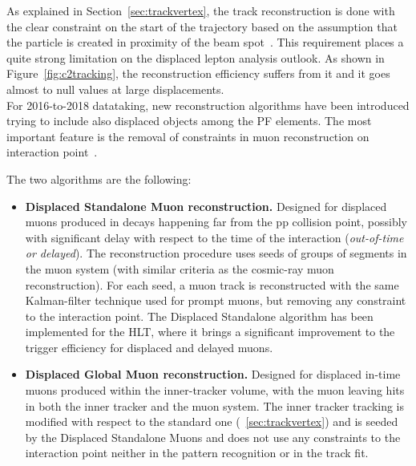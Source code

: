 As explained in Section~\ref{sec:trackvertex}, the track
reconstruction is done with the clear 
constraint on the start of the trajectory based on the assumption that the
particle is created in proximity of the beam
spot~\cite{Collaboration_2014_tracking}. This requirement places a
quite strong limitation on the displaced lepton analysis outlook. As
shown in Figure~\ref{fig:c2tracking}, the reconstruction efficiency
suffers from it and it goes almost to null values at large
displacements. \\
For 2016-to-2018 datataking, new reconstruction algorithms have been
introduced trying to include also displaced objects among
the PF elements. The most important feature is the removal of constraints in muon reconstruction
on interaction point~\cite{CMS-DP-2015-015, steven_slide}.

The two algorithms are the following:
\begin{itemize}
\setlength\itemsep{-0.2em}
\item \textbf{Displaced Standalone Muon reconstruction.} Designed for
  displaced muons produced in decays happening far from the pp
  collision point, possibly with significant delay with respect to the time of the
  interaction (\emph{out-of-time or delayed}). The reconstruction
  procedure uses seeds of groups of segments in the muon system
  (with similar criteria as the cosmic-ray muon reconstruction). For
  each seed, a muon track is reconstructed with the same Kalman-filter
  technique used for prompt muons, but removing any constraint to the
  interaction point. The Displaced Standalone algorithm has been implemented for the HLT,
  where it brings a significant improvement to the trigger efficiency for displaced and delayed
  muons.
\item \textbf{Displaced Global Muon reconstruction.} Designed for displaced in-time muons produced within the inner-tracker volume, with the
  muon leaving hits in both the inner tracker and the muon system. The
  inner tracker tracking is modified with respect to the standard one
  (~\ref{sec:trackvertex}) and is seeded by the Displaced Standalone Muons and does
  not use any constraints to the interaction point neither in the pattern recognition or in the track fit.
\end{itemize}

